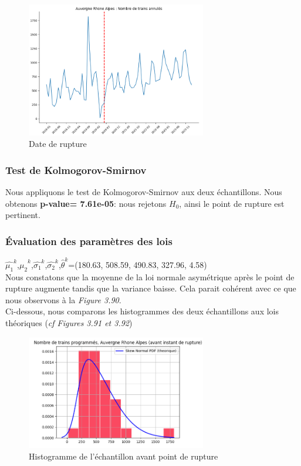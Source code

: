 {\begin{figure}[H]
  \centering
  \includegraphics[width=0.7\textwidth]{image/ARA_TA_3.png}
  \caption{Date de rupture}
\end{figure}

\subsubsection{Test de Kolmogorov-Smirnov}

Nous appliquons le test de Kolmogorov-Smirnov aux deux échantillons. Nous obtenons \textbf{p-value= 7.61e-05}: nous rejetons $H_0$, ainsi le point de rupture est pertinent.

\subsubsection{Évaluation des paramètres des lois}

$\hat{\mu_1}^k$,$\hat{\mu_2}^k$,$\hat{\sigma_1}^k$,$\hat{\sigma_2}^k$,$\hat{\theta}^k$=(180.63, 508.59, 490.83, 327.96, 4.58)\\

Nous constatons que la moyenne de la loi normale asymétrique après le point de rupture augmente tandis que la variance baisse. Cela parait cohérent avec ce que nous observons à la \textit{Figure 3.90}.\\

Ci-dessous, nous comparons les histogrammes des deux échantillons aux lois théoriques (\textit{cf Figures 3.91 et 3.92})

\begin{figure}[H]
  \centering
  \includegraphics[width=0.7\textwidth]{image/ARA_TA_4.png}
  \caption{Histogramme de l'échantillon avant point de rupture}
\end{figure}

}
